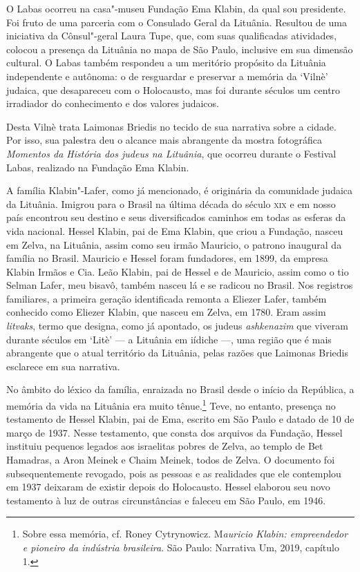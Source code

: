 O Labas ocorreu na casa"-museu Fundação Ema Klabin, da qual sou
presidente. Foi fruto de uma parceria com o Consulado Geral da Lituânia.
Resultou de uma iniciativa da Cônsul"-geral Laura Tupe, que, com suas
qualificadas atividades, colocou a presença da Lituânia no mapa de São
Paulo, inclusive em sua dimensão cultural. O Labas também respondeu a um
meritório propósito da Lituânia independente e autônoma: o de resguardar
e preservar a memória da `Vilnè' judaica, que desapareceu com o
Holocausto, mas foi durante séculos um centro irradiador do conhecimento
e dos valores judaicos.

Desta Vilnè trata Laimonas Briedis no tecido de sua narrativa sobre a
cidade. Por isso, sua palestra deu o alcance mais abrangente da mostra
fotográfica \emph{Momentos da História dos judeus na Lituânia}, que
ocorreu durante o Festival Labas, realizado na Fundação Ema Klabin.

A família Klabin"-Lafer, como já mencionado, é originária da comunidade
judaica da Lituânia. Imigrou para o Brasil na última década do século
\textsc{xix} e em nosso país encontrou seu destino e seus diversificados caminhos
em todas as esferas da vida nacional. Hessel Klabin, pai de Ema Klabin,
que criou a Fundação, nasceu em Zelva, na Lituânia, assim como seu irmão
Mauricio, o patrono inaugural da família no Brasil. Mauricio e Hessel
foram fundadores, em 1899, da empresa Klabin Irmãos e Cia. Leão Klabin,
pai de Hessel e de Mauricio, assim como o tio Selman Lafer, meu bisavô,
também nasceu lá e se radicou no Brasil. Nos registros familiares, a
primeira geração identificada remonta a Eliezer Lafer, também conhecido
como Eliezer Klabin, que nasceu em Zelva, em 1780. Eram assim
\emph{litvaks}, termo que designa, como já apontado, os judeus
\emph{ashkenazim} que viveram durante séculos em `Litè' --- a Lituânia em
iídiche ---, uma região que é mais abrangente que o atual território da
Lituânia, pelas razões que Laimonas Briedis esclarece em sua narrativa.

No âmbito do léxico da família, enraizada no Brasil desde o início da
República, a memória da vida na Lituânia era muito tênue.\footnote{Sobre
  essa memória, cf. Roney Cytrynowicz. M\emph{auricio Klabin:
  empreendedor e pioneiro da indústria brasileira}. São Paulo: Narrativa
  Um, 2019, capítulo 1.} Teve, no entanto, presença no testamento de
Hessel Klabin, pai de Ema, escrito em São Paulo e datado de 10 de março
de 1937. Nesse testamento, que consta dos arquivos da Fundação, Hessel
instituiu pequenos legados aos israelitas pobres de Zelva, ao templo de
Bet Hamadras, a Aron Meinek e Chaim Meinek, todos de Zelva. O documento
foi subsequentemente revogado, pois as pessoas e as realidades que ele
contemplou em 1937 deixaram de existir depois do Holocausto. Hessel
elaborou seu novo testamento à luz de outras circunstâncias e faleceu em
São Paulo, em 1946.

